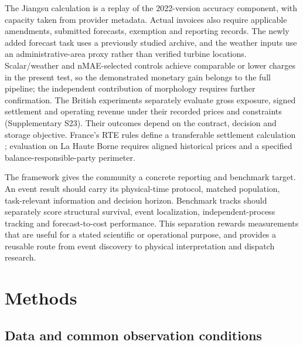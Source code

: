 \documentclass[preprint,12pt]{elsarticle}
\begin{document}
The Jiangsu calculation is a replay of the 2022-version accuracy component, with capacity taken from provider metadata. Actual invoices also require applicable amendments, submitted forecasts, exemption and reporting records. The newly added forecast task uses a previously studied archive, and the weather inputs use an administrative-area proxy rather than verified turbine locations. Scalar/weather and nMAE-selected controls achieve comparable or lower charges in the present test, so the demonstrated monetary gain belongs to the full pipeline; the independent contribution of morphology requires further confirmation. The British experiments separately evaluate gross exposure, signed settlement and operating revenue under their recorded prices and constraints (Supplementary S23). Their outcomes depend on the contract, decision and storage objective. France's RTE rules define a transferable settlement calculation \citep{rtesettlement}; evaluation on La Haute Borne requires aligned historical prices and a specified balance-responsible-party perimeter.

The framework gives the community a concrete reporting and benchmark target. An event result should carry its physical-time protocol, matched population, task-relevant information and decision horizon. Benchmark tracks should separately score structural survival, event localization, independent-process tracking and forecast-to-cost performance. This separation rewards measurements that are useful for a stated scientific or operational purpose, and provides a reusable route from event discovery to physical interpretation and dispatch research.

\FloatBarrier
\section{Methods}\label{methods}

\subsection{Data and common observation conditions}\label{data-and-common-observation-conditions}
\end{document}
